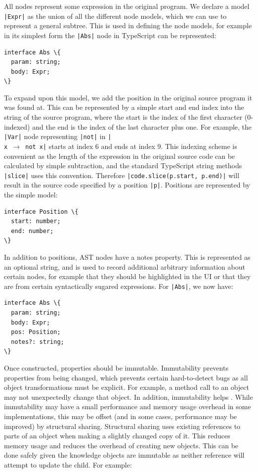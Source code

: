 \documentclass[a4paper,fleqn,twoside,12pt]{report}
\begin{document}
All nodes represent some expression in the original program. We declare a model \texttt{|Expr|} as the union of all the different node models, which we can use to represent a general subtree. This is used in defining the node models, for example in its simplest form the \texttt{|Abs|} node in TypeScript can be represented:

\begin{verbatim}
interface Abs \{
  param: string;
  body: Expr;
\}
\end{verbatim}

To expand upon this model, we add the position in the original source program it was found at. This can be represented by a simple start and end index into the string of the source program, where the start is the index of the first character (0-indexed) and the end is the index of the last character plus one. For example, the \texttt{|Var|} node representing \texttt{|not|} in \texttt{|\\x $\rightarrow$ not x|} starts at index 6 and ends at index 9. This indexing scheme is convenient as the length of the expression in the original source code can be calculated by simple subtraction, and the standard TypeScript string methods \texttt{|slice|} uses this convention. Therefore \texttt{|code.slice(p.start, p.end)|} will result in the source code specified by a position \texttt{|p|}. Positions are represented by the simple model:

\begin{verbatim}
interface Position \{
  start: number;
  end: number;
\}
\end{verbatim}

In addition to positions, AST nodes have a notes property. This is represented as an optional string, and is used to record additional arbitrary information about certain nodes, for example that they should be highlighted in the UI or that they are from certain syntactically sugared expressions. For \texttt{|Abs|}, we now have:

\begin{verbatim}
interface Abs \{
  param: string;
  body: Expr;
  pos: Position;
  notes?: string;
\}
\end{verbatim}

Once constructed, properties should be immutable. Immutability prevents properties from being changed, which prevents certain hard-to-detect bugs as all object transformations must be explicit. For example, a method call to an object may not unexpectedly change that object. In addition, immutability helps . While immutability may have a small performance and memory usage overhead in some implementations, this may be offset (and in some cases, performance may be improved) by structural sharing. Structural sharing uses existing references to parts of an object when making a slightly changed copy of it. This reduces memory usage and reduces the overhead of creating new objects. This can be done safely given the knowledge objects are immutable as neither reference will attempt to update the child. For example:
\end{document}
